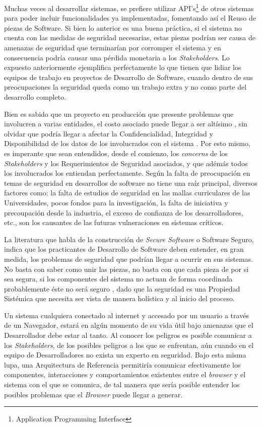 Muchas veces al desarrollar sistemas, se prefiere utilizar API's\footnote{Application Programming Interface} de otros sistemas para poder incluir funcionalidades ya implementadas, fomentando así el Reuso de piezas de Software. Si bien lo anterior es una buena práctica, si el sistema no cuenta con las medidas de seguridad necesarias, estas piezas podrían ser causa de amenazas de seguridad que terminarían por corromper el sistema y en consecuencia podría causar una pérdida monetaria a los \textit{Stakeholders}. Lo expuesto anteriormente ejemplifica perfectamente lo que tienen que lidiar los equipos de trabajo en proyectos de Desarrollo de Software, cuando dentro de sus preocupaciones la seguridad queda como un trabajo extra y no como parte del desarrollo completo. 

Bien es sabido que un proyecto en producción que presente problemas que involucren a varias entidades, el costo asociado puede llegar a ser altísimo \cite{cert}, sin olvidar que podría llegar a afectar la Confidencialidad, Integridad y Disponibilidad de los datos de los involucrados con el sistema  \cite{interCoursera}. Por esto mismo, es imperante que sean entendidos, desde el comienzo, los \textit{concerns} de los \textit{Stakeholders} y los Requerimientos de Seguridad asociados, y que adémás todos los involucrados los entiendan perfectamente. Según \cite{WhyteHarrison} la falta de preocupación en temas de seguridad en desarrollos de software no tiene una raíz principal, diversos factores como: la falta de estudios de seguridad en las mallas curriculares de las Universidades, pocos fondos para la investigación, la falta de iniciativa y precoupación desde la industria, el exceso de confianza de los desarrolladores, etc., son los causantes de las futuras vulneraciones en sistemas críticos. 

La literatura que habla de la construcción de \textit{Secure Software} o Software Seguro, indica que los practicantes de Desarrollo de Software deben entender, en gran medida, los problemas de seguridad que podrían llegar a ocurrir en sus sistemas. No basta con saber como unir las piezas, no basta con que cada pieza de por si sea segura, si los componentes del sistema no actuan de forma coordinada probablemente éste no será seguro \cite{fernandez2013security}, dado que la seguridad es una Propiedad Sistémica que necesita ser vista de manera holística y al inicio del proceso.

Un sistema cualquiera conectado al internet y accesado por un usuario a través de un Navegador, estará en algún momento de su vida útil bajo amenazas que el Desarrollador debe estar al tanto. Al conocer los peligros es posible comunicar a los \textit{Stakeholders}, de los posibles peligros a los que se enfrentan, aún cuando en el equipo de Desarrolladores no exista un experto en seguridad. Bajo esta misma lupa, una Arquitectura de Referencia permitiría comunicar efectivamente los componentes, interacciones y comportamientos existentes entre el \textit{browser} y el sistema con el que se comunica, de tal manera que sería posible entender los posibles problemas que el \textit{Browser} puede llegar a generar. 

